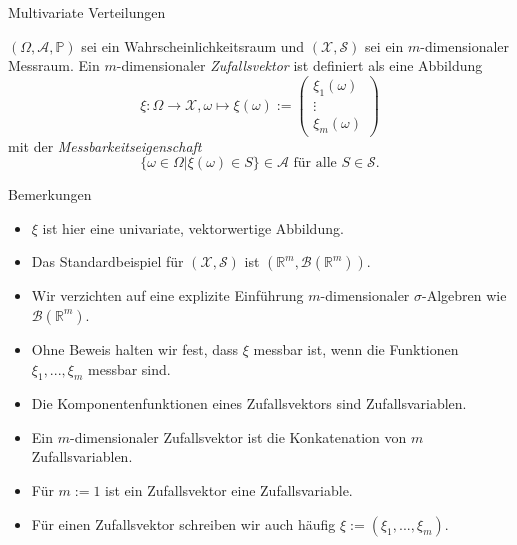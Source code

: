 \documentclass[
  8pt,
  ignorenonframetext,
]{beamer}
\providecommand{\tightlist}{%
  \setlength{\itemsep}{0pt}\setlength{\parskip}{0pt}}
\begin{document}
\begin{frame}{Multivariate Verteilungen}
\protect\hypertarget{multivariate-verteilungen-1}{}
\footnotesize
\begin{definition}[Zufallsvektor]
\justifying
$(\Omega, \mathcal{A}, \mathbb{P})$ sei ein Wahrscheinlichkeitsraum und
$(\mathcal{X},\mathcal{S})$ sei ein $m$-dimensionaler Messraum.
Ein $m$-dimensionaler \textit{Zufallsvektor} ist definiert als eine Abbildung
\begin{equation}
\xi:\Omega \to \mathcal{X}, \omega \mapsto \xi(\omega) :=
\begin{pmatrix}
\xi_1(\omega) \\
\vdots      \\
\xi_m(\omega)
\end{pmatrix}
\end{equation}
mit der \textit{Messbarkeitseigenschaft}
\begin{equation}
\{\omega \in \Omega|\xi(\omega) \in S \} \in \mathcal{A} \mbox{ für alle } S \in \mathcal{S}.
\end{equation}
\end{definition}
\vspace{-2mm}
\footnotesize

Bemerkungen \vspace{-2mm}

\begin{itemize}
\tightlist
\item
  \(\xi\) ist hier eine univariate, vektorwertige Abbildung.
\item
  Das Standardbeispiel für \((\mathcal{X},\mathcal{S})\) ist
  \((\mathbb{R}^m, \mathcal{B}(\mathbb{R}^m))\).
\item
  Wir verzichten auf eine explizite Einführung \(m\)-dimensionaler
  \(\sigma\)-Algebren wie \(\mathcal{B}(\mathbb{R}^m)\).
\item
  Ohne Beweis halten wir fest, dass \(\xi\) messbar ist, wenn die
  Funktionen \(\xi_1,...,\xi_m\) messbar sind.
\item
  Die Komponentenfunktionen eines Zufallsvektors sind Zufallsvariablen.
\item
  Ein \(m\)-dimensionaler Zufallsvektor ist die Konkatenation von \(m\)
  Zufallsvariablen.
\item
  Für \(m := 1\) ist ein Zufallsvektor eine Zufallsvariable.
\item
  Für einen Zufallsvektor schreiben wir auch häufig
  \(\xi:= (\xi_1,...,\xi_m)\).
\end{itemize}
\end{frame}
\end{document}
